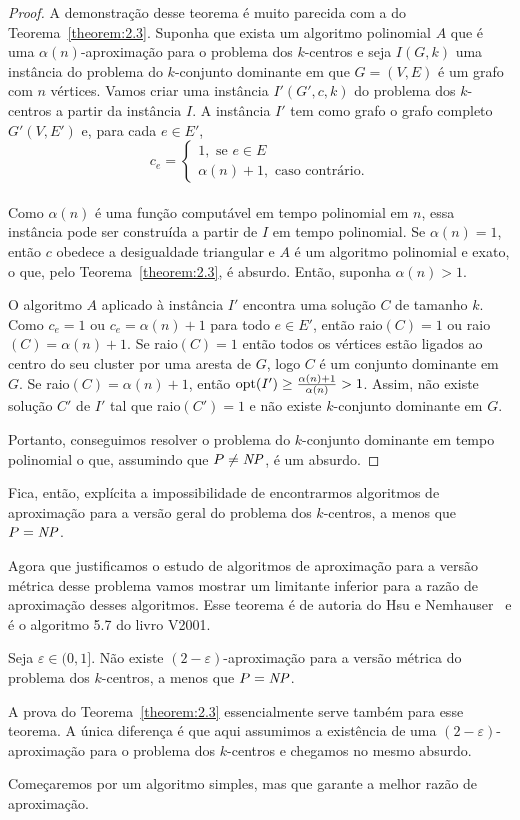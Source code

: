 \begin{proof}
    A demonstração desse teorema é muito parecida com a do Teorema~\ref{theorem:2.3}.
    Suponha que exista um algoritmo polinomial $A$ que é uma $\alpha(n)$-aproximação para o problema dos $k$-centros e seja $I(G,k)$ uma instância do problema do $k$-conjunto dominante em que $G = (V,E)$ é um grafo com $n$ vértices. Vamos criar uma instância $I'(G',c,k)$ do problema dos $k$-centros a partir da instância $I$. A instância $I'$ tem como grafo o grafo completo $G'(V,E')$ e, para cada $e \in E'$,
    \[c_e = \begin{cases}
            1, \text{ se } e \in E \\
            \alpha(n)+1, \text{ caso contrário.} 
            \end{cases}\]\\
    Como $\alpha(n)$ é uma função computável em tempo polinomial em $n$, essa instância pode ser construída a partir de $I$ em tempo polinomial.
    Se $\alpha(n)=1$, então $c$ obedece a desigualdade triangular e $A$ é um algoritmo polinomial e exato, o que, pelo Teorema~\ref{theorem:2.3}, é absurdo. Então, suponha $\alpha(n)>1$.

    O algoritmo $A$ aplicado à instância $I'$ encontra uma solução $C$ de tamanho $k$. Como $c_e = 1$ ou $c_e = \alpha(n)+1$ para todo $e \in E'$, então raio$(C)=1$ ou raio$(C)=\alpha(n)+1$.
    Se raio$(C)=1$ então todos os vértices estão ligados ao centro do seu cluster por uma aresta de $G$, logo $C$ é um conjunto dominante em $G$.
    Se raio$(C) = \alpha(n) + 1$, então $\mathrm{opt}(I') \geq \frac{\alpha(n)+1}{\alpha(n)}>1$. Assim, não existe solução $C'$ de $I'$ tal que raio$(C')=1$ e não existe $k$-conjunto dominante em $G$.

    Portanto, conseguimos resolver o problema do $k$-conjunto dominante em tempo polinomial o que, assumindo que $P \neq \mathit{NP}$, é um absurdo.
\end{proof}
    Fica, então, explícita a impossibilidade de encontrarmos algoritmos de aproximação para a versão geral do problema dos $k$-centros, a menos que $P = \mathit{NP}$.

    Agora que justificamos o estudo de algoritmos de aproximação para a versão métrica desse problema vamos mostrar um limitante inferior para a razão de aproximação desses algoritmos. Esse teorema é de autoria do Hsu e Nemhauser~\cite{HSU1979209} e é o algoritmo 5.7 do livro V2001.
    
    \begin{theorem}
        Seja $\varepsilon \in (0,1]$. Não existe $(2-\varepsilon)$-aproximação para a versão métrica do problema dos $k$-centros, a menos que $P=\mathit{NP}$.
    \end{theorem}
    A prova do Teorema~\ref{theorem:2.3} essencialmente serve também para esse teorema. A única diferença é que aqui assumimos a existência de uma $(2 - \varepsilon)$-aproximação para o problema dos $k$-centros e chegamos no mesmo absurdo.

    Começaremos por um algoritmo simples, mas que garante a melhor razão de aproximação.